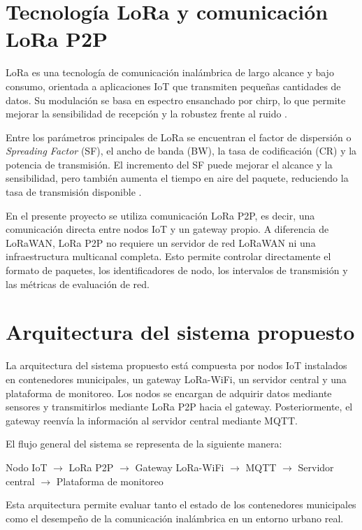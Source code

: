 \section{Tecnología LoRa y comunicación LoRa P2P}

LoRa es una tecnología de comunicación inalámbrica de largo alcance y bajo consumo, orientada a aplicaciones IoT que transmiten pequeñas cantidades de datos. Su modulación se basa en espectro ensanchado por chirp, lo que permite mejorar la sensibilidad de recepción y la robustez frente al ruido \cite{semtech2015loramod}.

Entre los parámetros principales de LoRa se encuentran el factor de dispersión o \textit{Spreading Factor} (SF), el ancho de banda (BW), la tasa de codificación (CR) y la potencia de transmisión. El incremento del SF puede mejorar el alcance y la sensibilidad, pero también aumenta el tiempo en aire del paquete, reduciendo la tasa de transmisión disponible \cite{ttn_spreading,ttn_modulation}.

En el presente proyecto se utiliza comunicación LoRa P2P, es decir, una comunicación directa entre nodos IoT y un gateway propio. A diferencia de LoRaWAN, LoRa P2P no requiere un servidor de red LoRaWAN ni una infraestructura multicanal completa. Esto permite controlar directamente el formato de paquetes, los identificadores de nodo, los intervalos de transmisión y las métricas de evaluación de red.

\section{Arquitectura del sistema propuesto}

La arquitectura del sistema propuesto está compuesta por nodos IoT instalados en contenedores municipales, un gateway LoRa-WiFi, un servidor central y una plataforma de monitoreo. Los nodos se encargan de adquirir datos mediante sensores y transmitirlos mediante LoRa P2P hacia el gateway. Posteriormente, el gateway reenvía la información al servidor central mediante MQTT.

El flujo general del sistema se representa de la siguiente manera:

\begin{center}
Nodo IoT $\rightarrow$ LoRa P2P $\rightarrow$ Gateway LoRa-WiFi $\rightarrow$ MQTT $\rightarrow$ Servidor central $\rightarrow$ Plataforma de monitoreo
\end{center}

Esta arquitectura permite evaluar tanto el estado de los contenedores municipales como el desempeño de la comunicación inalámbrica en un entorno urbano real.

